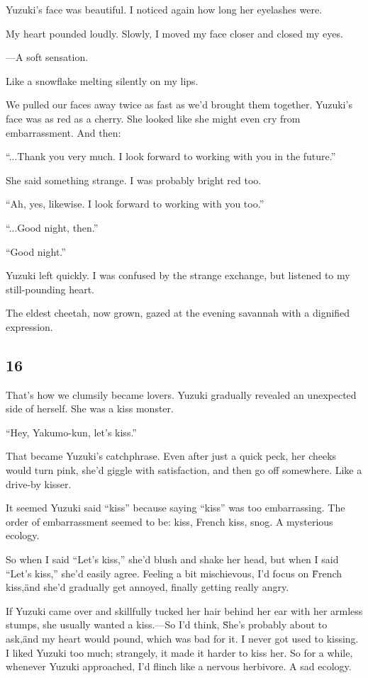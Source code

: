 \documentclass[
    a4paper,
    12pt,
    twoside,
    openany,
    UTF8,
    fontset=windows
]{ctexbook}
\begin{document}
Yuzuki's face was beautiful. I noticed again how long her eyelashes were.

My heart pounded loudly. Slowly, I moved my face closer and closed my eyes.

---A soft sensation.

Like a snowflake melting silently on my lips.

We pulled our faces away twice as fast as we'd brought them together. Yuzuki's face was as red as a cherry. She looked like she might even cry from embarrassment. And then:

``...Thank you very much. I look forward to working with you in the future.''

She said something strange. I was probably bright red too.

``Ah, yes, likewise. I look forward to working with you too.''

``...Good night, then.''

``Good night.''

Yuzuki left quickly. I was confused by the strange exchange, but listened to my still-pounding heart.

The eldest cheetah, now grown, gazed at the evening savannah with a dignified expression.


\subsection*{16}

That's how we clumsily became lovers. Yuzuki gradually revealed an unexpected side of herself. She was a kiss monster.

``Hey, Yakumo-kun, let's kiss.''

That became Yuzuki's catchphrase. Even after just a quick peck, her cheeks would turn pink, she'd giggle with satisfaction, and then go off somewhere. Like a drive-by kisser.

It seemed Yuzuki said ``kiss'' because saying ``kiss'' was too embarrassing. The order of embarrassment seemed to be: kiss, French kiss, snog. A mysterious ecology.

So when I said ``Let's kiss,'' she'd blush and shake her head, but when I said ``Let's kiss,'' she'd easily agree. Feeling a bit mischievous, I'd focus on \"French kiss,\" and she'd gradually get annoyed, finally getting really angry.

If Yuzuki came over and skillfully tucked her hair behind her ear with her armless stumps, she usually wanted a kiss.---So I'd think, \"She's probably about to ask,\" and my heart would pound, which was bad for it. I never got used to kissing. I liked Yuzuki too much; strangely, it made it harder to kiss her. So for a while, whenever Yuzuki approached, I'd flinch like a nervous herbivore. A sad ecology.
\end{document}
